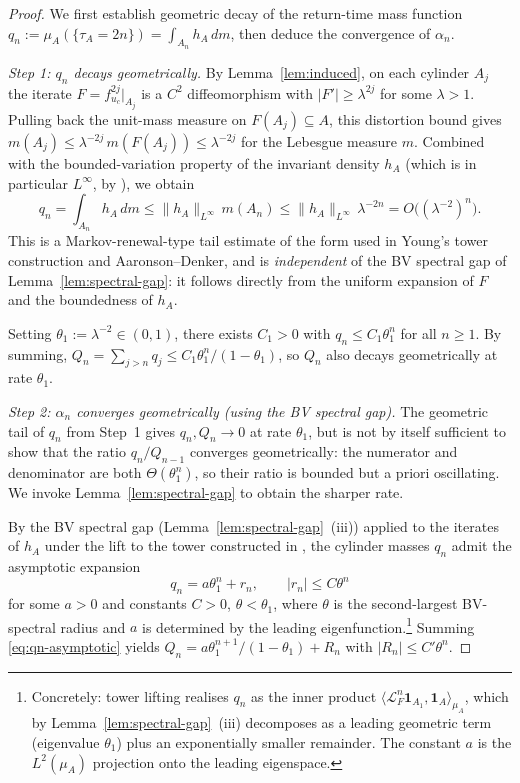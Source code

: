 \begin{proof}
We first establish geometric decay of the return-time mass function
$q_n := \mu_A(\{\tau_A = 2n\}) = \int_{A_n} h_A \, dm$, then deduce
the convergence of $\alpha_n$.

\smallskip
\emph{Step 1: $q_n$ decays geometrically.}
By Lemma~\ref{lem:induced}, on each cylinder $A_j$ the iterate
$F = f_{u_c}^{2j}|_{A_j}$ is a $C^2$ diffeomorphism with
$|F'| \geq \lambda^{2j}$ for some $\lambda > 1$. Pulling back the
unit-mass measure on $F(A_j) \subseteq A$, this distortion bound gives
$m(A_j) \leq \lambda^{-2j} \, m(F(A_j)) \leq \lambda^{-2j}$ for the
Lebesgue measure $m$. Combined with the bounded-variation property of
the invariant density $h_A$ (which is in particular $L^\infty$, by
\cite[Theorem~5.2]{demelo1993one}), we obtain
\[
    q_n = \int_{A_n} h_A \, dm
    \leq \|h_A\|_{L^\infty} \, m(A_n)
    \leq \|h_A\|_{L^\infty} \, \lambda^{-2n}
    = O\bigl((\lambda^{-2})^n\bigr).
\]
This is a Markov-renewal-type tail estimate of the form used in Young's
tower construction \cite{young1992decay} and Aaronson--Denker, and is
\emph{independent} of the BV spectral gap of
Lemma~\ref{lem:spectral-gap}: it follows directly from the uniform
expansion of $F$ and the boundedness of $h_A$.

Setting $\theta_1 := \lambda^{-2} \in (0, 1)$, there exists $C_1 > 0$
with $q_n \leq C_1 \theta_1^n$ for all $n \geq 1$. By summing,
$Q_n = \sum_{j > n} q_j \leq C_1 \theta_1^n / (1 - \theta_1)$, so
$Q_n$ also decays geometrically at rate $\theta_1$.

\smallskip
\emph{Step 2: $\alpha_n$ converges geometrically (using the BV
spectral gap).}
The geometric tail of $q_n$ from Step~1 gives $q_n, Q_n \to 0$ at rate
$\theta_1$, but is not by itself sufficient to show that the ratio
$q_n / Q_{n-1}$ converges geometrically: the numerator and denominator
are both $\Theta(\theta_1^n)$, so their ratio is bounded but a priori
oscillating. We invoke Lemma~\ref{lem:spectral-gap} to obtain the
sharper rate.

By the BV spectral gap (Lemma~\ref{lem:spectral-gap}~(iii)) applied to
the iterates of $h_A$ under the lift to the tower constructed in
\cite[\S 2]{young1992decay}, the cylinder masses $q_n$ admit the
asymptotic expansion
\begin{equation}
\label{eq:qn-asymptotic}
    q_n = a \theta_1^n + r_n,
    \qquad |r_n| \leq C \theta^n
\end{equation}
for some $a > 0$ and constants $C > 0$, $\theta < \theta_1$, where
$\theta$ is the second-largest BV-spectral radius and $a$ is determined
by the leading eigenfunction.\footnote{Concretely: tower lifting
realises $q_n$ as the inner product $\langle \mathcal{L}_F^n \mathbf{1}_{A_1}, \mathbf{1}_A \rangle_{\mu_A}$,
which by Lemma~\ref{lem:spectral-gap}~(iii) decomposes as a leading
geometric term (eigenvalue $\theta_1$) plus an exponentially smaller
remainder. The constant $a$ is the $L^2(\mu_A)$ projection onto the
leading eigenspace.} Summing \eqref{eq:qn-asymptotic} yields
$Q_n = a \theta_1^{n+1} / (1 - \theta_1) + R_n$ with $|R_n| \leq C' \theta^n$.


\end{proof}
